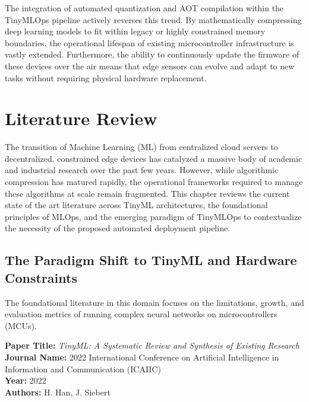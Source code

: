 \documentclass[11pt,a4paper,openany]{book}
\begin{document}
The integration of automated quantization and AOT compilation within the TinyMLOps pipeline actively reverses this trend. By mathematically compressing deep learning models to fit within legacy or highly constrained memory boundaries, the operational lifespan of existing microcontroller infrastructure is vastly extended. Furthermore, the ability to continuously update the firmware of these devices over the air means that edge sensors can evolve and adapt to new tasks without requiring physical hardware replacement.

\chapter{Literature Review}

The transition of Machine Learning (ML) from centralized cloud servers to decentralized, constrained edge devices has catalyzed a massive body of academic and industrial research over the past few years. However, while algorithmic compression has matured rapidly, the operational frameworks required to manage these algorithms at scale remain fragmented. This chapter reviews the current state of the art literature across TinyML architectures, the foundational principles of MLOps, and the emerging paradigm of TinyMLOps to contextualize the necessity of the proposed automated deployment pipeline.

\section{The Paradigm Shift to TinyML and Hardware Constraints}

The foundational literature in this domain focuses on the limitations, growth, and evaluation metrics of running complex neural networks on microcontrollers (MCUs).

\vspace{1.5em}
\noindent\textbf{Paper Title:} \textit{TinyML: A Systematic Review and Synthesis of Existing Research} \cite{4}\\
\textbf{Journal Name:} 2022 International Conference on Artificial Intelligence in Information and Communication (ICAIIC)\\
\textbf{Year:} 2022\\
\textbf{Authors:} H. Han, J. Siebert
\end{document}
